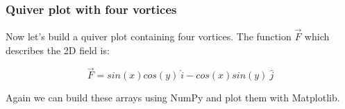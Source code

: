 \documentclass{book}
\begin{document}
    \begin{center}
    \end{center}
    { \hspace*{\fill} \\}
    

    
        \subsubsection{Quiver plot with four
vortices}\label{quiver-plot-with-four-vortices}

Now let's build a quiver plot containing four vortices. The function
\(\vec{F}\) which describes the 2D field is:

\[ \vec{F} = sin(x)cos(y) \ \hat{i} -cos(x)sin(y) \ \hat{j} \]

Again we can build these arrays using NumPy and plot them with
Matplotlib.
    
\end{document}
